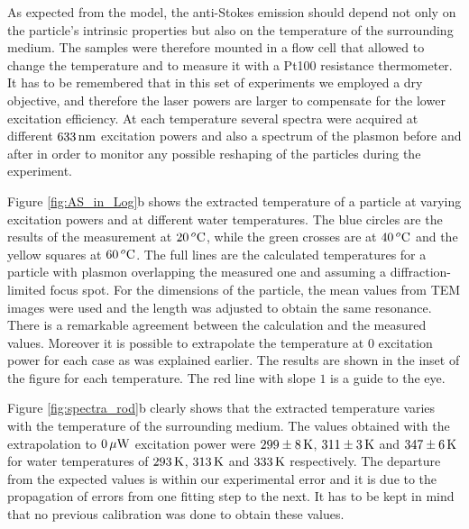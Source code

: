 
As expected from the model, the anti-Stokes emission should depend not only on
the particle's intrinsic properties but also on the temperature of the
surrounding medium\cite{Konrad2013}. The samples were therefore mounted in a
flow cell that allowed to change the temperature and to measure it with a Pt100
resistance thermometer. It has to be remembered that in this set of experiments
we employed a dry objective, and therefore the laser powers are larger to
compensate for the lower excitation efficiency. At each temperature several
spectra were acquired at different $633\,\textrm{nm}$ excitation powers and also a
spectrum of the plasmon before and after in order to monitor any possible
reshaping of the particles during the experiment.

Figure \ref{fig:AS_in_Log}b shows the extracted temperature of a particle at
varying excitation powers and at different water temperatures. The blue circles
are the results of the measurement at $20\,^o\textrm{C}$, while the green crosses are
at $40\,^o\textrm{C}$ and the yellow squares at $60\,^o\textrm{C}$. The full lines are the
calculated temperatures for a particle with plasmon overlapping the measured one
and assuming a diffraction-limited focus spot. For the dimensions of the
particle, the mean values from TEM images were used and the length was adjusted
to obtain the same resonance. There is a remarkable agreement between the
calculation and the measured values. Moreover it is possible to extrapolate the
temperature at $0$ excitation power for each case as was explained earlier. The
results are shown in the inset of the figure for each temperature. The red line
with slope $1$ is a guide to the eye.

Figure \ref{fig:spectra_rod}b clearly shows that the extracted temperature
varies with the temperature of the surrounding medium. The values obtained with
the extrapolation to $0\,\mu\textrm{W}$ excitation power were $299 \pm 8\,\textrm{K}$, $311\pm 3\,\textrm{K}$
and $347 \pm 6\,\textrm{K}$ for water temperatures of $293\,\textrm{K}$, $313\,\textrm{K}$ and $333\,\textrm{K}$
respectively. The departure from the expected values is within our experimental
error and it is due to the propagation of errors from one fitting step to the
next. It has to be kept in mind that no previous calibration was done to obtain
these values.

